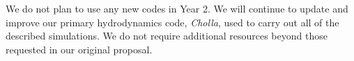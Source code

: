 \documentclass[11pt,letterpaper,english]{article}
\begin{document}




We do not plan to use any new codes in Year 2. We will continue to update and improve our primary hydrodynamics code, \textit{Cholla}, used to carry out all of the described simulations. We do not require additional
resources beyond those requested in our original proposal.
\end{document}
